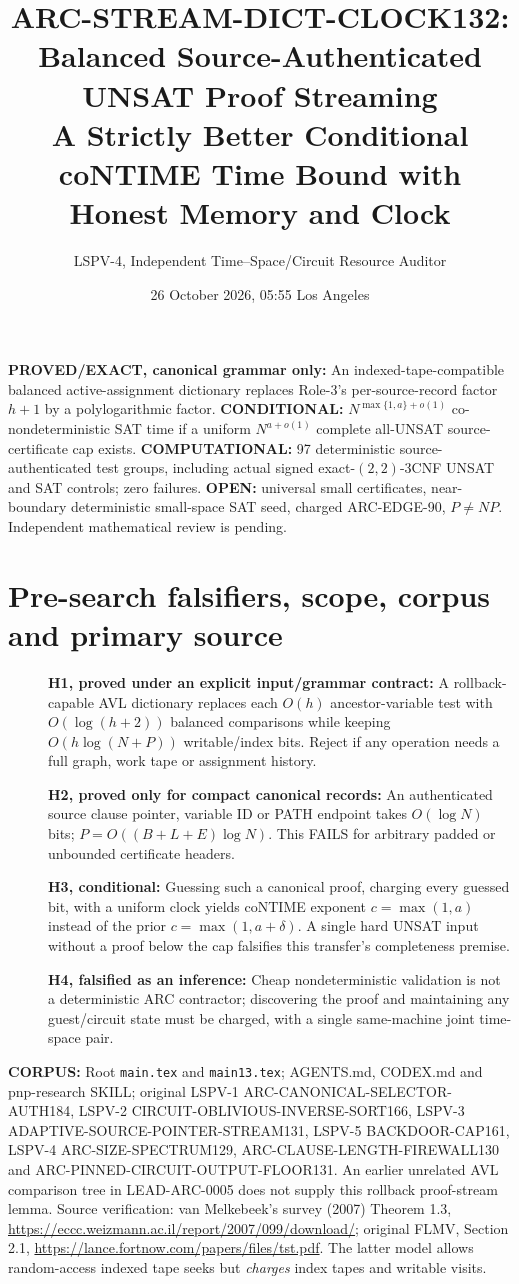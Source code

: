 \documentclass[11pt]{article}
\title{ARC-STREAM-DICT-CLOCK132: Balanced Source-Authenticated UNSAT Proof Streaming\\A Strictly Better Conditional coNTIME Time Bound with Honest Memory and Clock}
\author{LSPV-4, Independent Time--Space/Circuit Resource Auditor}
\date{26 October 2026, 05:55 Los Angeles}
\begin{document}
\maketitle
\noindent\textbf{PROVED/EXACT, canonical grammar only:} An indexed-tape-compatible balanced active-assignment dictionary replaces Role-3's per-source-record factor \(h+1\) by a polylogarithmic factor. \textbf{CONDITIONAL:} \(N^{\max\{1,a\}+o(1)}\) co-nondeterministic SAT time if a uniform \(N^{a+o(1)}\) complete all-UNSAT source-certificate cap exists. \textbf{COMPUTATIONAL:} 97 deterministic source-authenticated test groups, including actual signed exact-$(2,2)$-3CNF UNSAT and SAT controls; zero failures. \textbf{OPEN:} universal small certificates, near-boundary deterministic small-space SAT seed, charged ARC-EDGE-90, \(P\ne NP\). Independent mathematical review is pending.

\section{Pre-search falsifiers, scope, corpus and primary source}
\begin{description}
\item[] \textbf{H1, proved under an explicit input/grammar contract:} A rollback-capable AVL dictionary replaces each \(O(h)\) ancestor-variable test with \(O(\log(h+2))\) balanced comparisons while keeping \(O(h\log(N+P))\) writable/index bits. Reject if any operation needs a full graph, work tape or assignment history.
\item[] \textbf{H2, proved only for compact canonical records:} An authenticated source clause pointer, variable ID or PATH endpoint takes \(O(\log N)\) bits; \(P=O((B+L+E)\log N)\). This FAILS for arbitrary padded or unbounded certificate headers.
\item[] \textbf{H3, conditional:} Guessing such a canonical proof, charging every guessed bit, with a uniform clock yields coNTIME exponent \(c=\max(1,a)\) instead of the prior \(c=\max(1,a+\delta)\). A single hard UNSAT input without a proof below the cap falsifies this transfer's completeness premise.
\item[] \textbf{H4, falsified as an inference:} Cheap nondeterministic validation is not a deterministic ARC contractor; discovering the proof and maintaining any guest/circuit state must be charged, with a single same-machine joint time-space pair.
\end{description}
\noindent\textbf{CORPUS:} Root \texttt{main.tex} and \texttt{main13.tex}; AGENTS.md, CODEX.md and pnp-research SKILL; original LSPV-1 ARC-CANONICAL-SELECTOR-AUTH184, LSPV-2 CIRCUIT-OBLIVIOUS-INVERSE-SORT166, LSPV-3 ADAPTIVE-SOURCE-POINTER-STREAM131, LSPV-5 BACKDOOR-CAP161, LSPV-4 ARC-SIZE-SPECTRUM129, ARC-CLAUSE-LENGTH-FIREWALL130 and ARC-PINNED-CIRCUIT-OUTPUT-FLOOR131. An earlier unrelated AVL comparison tree in LEAD-ARC-0005 does not supply this rollback proof-stream lemma. Source verification: van Melkebeek's survey (2007) Theorem 1.3, \url{https://eccc.weizmann.ac.il/report/2007/099/download/}; original FLMV, Section 2.1, \url{https://lance.fortnow.com/papers/files/tst.pdf}. The latter model allows random-access indexed tape seeks but \emph{charges} index tapes and writable visits.
\end{document}
